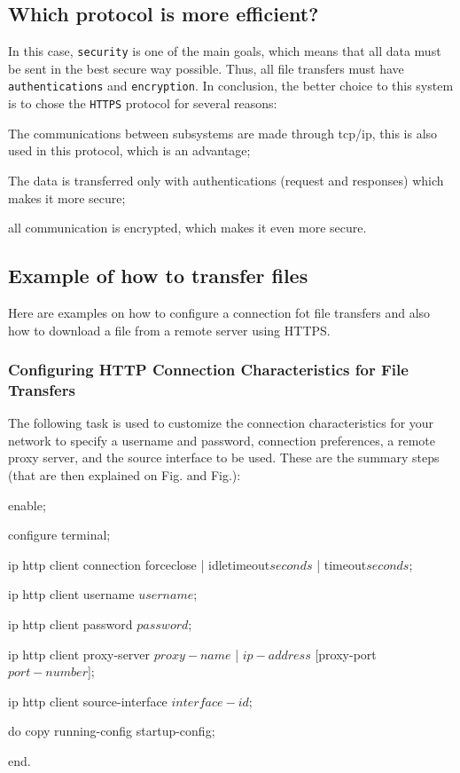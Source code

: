 \subsection{Which protocol is more efficient?}
\label{sub-sec:prot-effic}

In this case, \texttt{security} is one of the main goals, which means that all data must be sent in the best secure way possible. Thus, all file transfers must have \texttt{authentications} and \texttt{encryption}.
%
In conclusion, the better choice to this system is to chose the \texttt{HTTPS} protocol for several reasons:
\begin{item-c}
\item The communications between subsystems are made through \gls{tcp}/\gls{ip}, this is also used in this protocol, which is an advantage;
\item The data is transferred only with authentications (request and responses) which makes it more secure;
\item all communication is encrypted, which makes it even more secure.
\end{item-c} 

\subsection{Example of how to transfer files}
\label{sub-sec:file-transf-ex}

Here are examples on how to configure a connection fot file transfers and also how to download a file from a remote server using HTTPS.

\subsubsection{Configuring HTTP Connection Characteristics for File Transfers}
The following task is used to customize the connection characteristics for your network to specify a username and password, connection preferences, a remote proxy server, and the source interface to be used. These are the summary steps (that are then explained on Fig. and Fig.):

\begin{enumerate-c}
\item enable;
\item configure terminal;
\item ip http client connection {forceclose | idletimeout$seconds$ | timeout$seconds$};
\item ip http client username $username$;
\item ip http client password $password$;
\item ip http client proxy-server {$proxy-name$ | $ip-address$} [proxy-port$port-number$];
\item ip http client source-interface $interface-id$;
\item do copy running-config startup-config;
\item end.
\end{enumerate-c}


